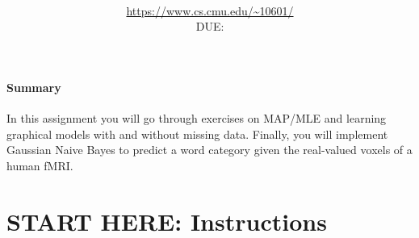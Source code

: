 \documentclass[11pt,addpoints,answers]{exam}
\title{\textsc{\hwName}
} %
\author{\courseName\\
\url{https://www.cs.cmu.edu/~10601/} \\
DUE: \dueDate{} \\ 
}
\date{}
\date{}
\begin{document}
\maketitle

\begin{notebox}
\paragraph{Summary} In this assignment you will go through exercises on MAP/MLE and learning graphical models with and without missing data. Finally, you will implement Gaussian Naive Bayes to predict a word category given the real-valued voxels of a human fMRI.
\end{notebox}\section*{START HERE: Instructions}
\end{document}
